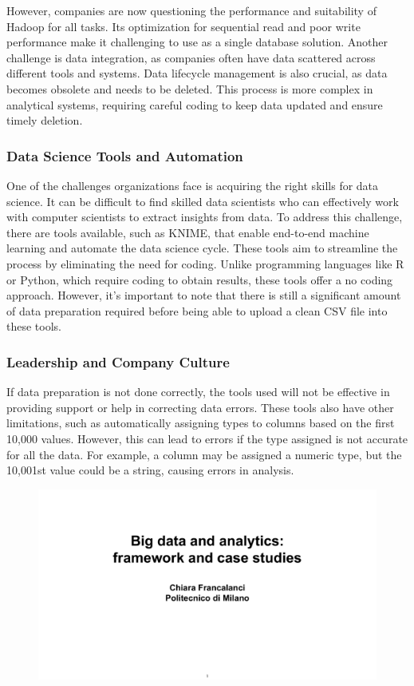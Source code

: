However, companies are now questioning the performance and suitability
of Hadoop for all tasks. Its optimization for sequential read and poor
write performance make it challenging to use as a single database
solution. Another challenge is data integration, as companies often have
data scattered across different tools and systems. Data lifecycle
management is also crucial, as data becomes obsolete and needs to be
deleted. This process is more complex in analytical systems, requiring
careful coding to keep data updated and ensure timely deletion.


\subsubsection{Data Science Tools and Automation}

One of the challenges organizations face is acquiring the right skills
for data science. It can be difficult to find skilled data scientists
who can effectively work with computer scientists to extract insights
from data. To address this challenge, there are tools available, such as
KNIME, that enable end-to-end machine learning and automate the data
science cycle. These tools aim to streamline the process by eliminating
the need for coding. Unlike programming languages like R or Python,
which require coding to obtain results, these tools offer a no coding
approach. However, it's important to note that there is still a
significant amount of data preparation required before being able to
upload a clean CSV file into these tools.

\subsubsection{Leadership and Company Culture}

If data preparation is not done correctly, the tools used will not be
effective in providing support or help in correcting data errors. These
tools also have other limitations, such as automatically assigning types
to columns based on the first 10,000 values. However, this can lead to
errors if the type assigned is not accurate for all the data. For
example, a column may be assigned a numeric type, but the 10,001st value
could be a string, causing errors in analysis.

\begin{figure}[!h]
    \centering
    \includegraphics[page=55, trim = 1.5cm 4cm 1cm 4.5cm, clip, width=\textwidth]{images/06 - BIG_DATA.pdf}
\end{figure}

